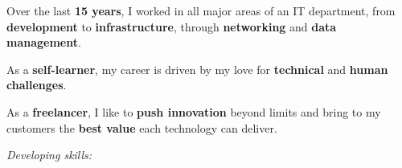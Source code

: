 
Over the last \textbf{15 years}, I worked in all major areas of an IT
department, from \textbf{development} to \textbf{infrastructure}, through
\textbf{networking} and \textbf{data management}.\\

\medskip

As a \textbf{self-learner}, my career is driven
by my love for \textbf{technical} and \textbf{human challenges}.\\

\medskip

As a \textbf{freelancer}, I like to \textbf{push innovation} beyond limits and
bring to my customers the \textbf{best value} each technology can deliver.\\

\medskip









\divider


\divider


\divider

\textit{Developing skills:}\\
\medskip


\medskip


\divider

\divider

\divider


\medskip

